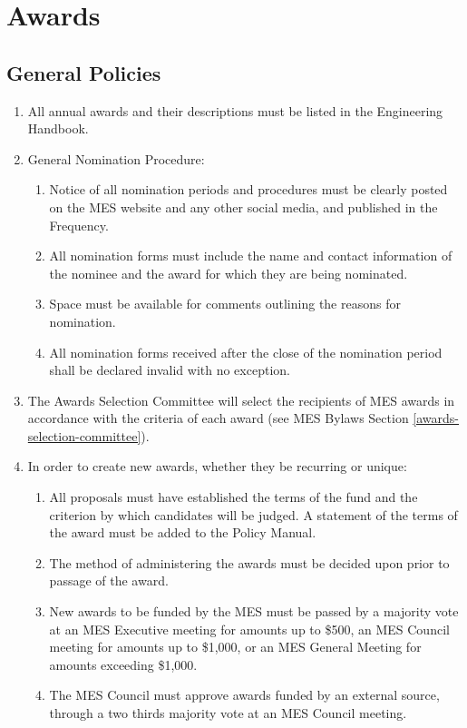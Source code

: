 \section{Awards}
\label{awards}

\subsection{General Policies}
\label{general-policies}
\begin{enumerate}
 \item
  All annual awards and their descriptions must be listed in the Engineering Handbook.
 \item
  General Nomination Procedure:

  \begin{enumerate}
   \item
    Notice of all nomination periods and procedures must be clearly posted on the MES website and any other social media, and published in the Frequency.
   \item
    All nomination forms must include the name and contact information of the nominee and the award for which they are being nominated.
   \item
    Space must be available for comments outlining the reasons for nomination.
   \item
    All nomination forms received after the close of the nomination period shall be declared invalid with no exception.
  \end{enumerate}
 \item
  The Awards Selection Committee will select the recipients of MES awards in accordance with the criteria of each award (see MES Bylaws Section \ref{awards-selection-committee}).
 \item
  In order to create new awards, whether they be recurring or unique:

  \begin{enumerate}
   \item
    All proposals must have established the terms of the fund and the criterion by which candidates will be judged. A statement of the terms of the award must be added to the Policy Manual. %
   \item
    The method of administering the awards must be decided upon prior to passage of the award.
   \item
    New awards to be funded by the MES must be passed by a majority vote at an MES Executive meeting for amounts up to \$500, an MES Council meeting for amounts up to \$1,000, or an MES General Meeting for amounts exceeding \$1,000.
   \item
    The MES Council must approve awards funded by an external source, through a two thirds majority vote at an MES Council meeting.
  \end{enumerate}
\end{enumerate}

